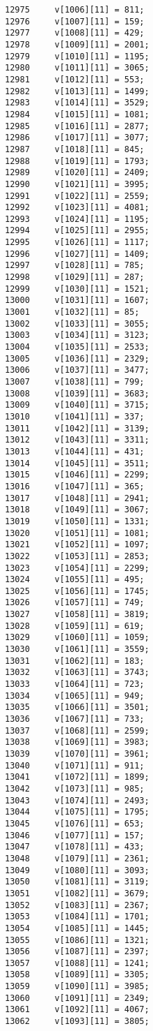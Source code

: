 \begin{Code}
\begin{verbatim}
12975     v[1006][11] = 811;
12976     v[1007][11] = 159;
12977     v[1008][11] = 429;
12978     v[1009][11] = 2001;
12979     v[1010][11] = 1195;
12980     v[1011][11] = 3065;
12981     v[1012][11] = 553;
12982     v[1013][11] = 1499;
12983     v[1014][11] = 3529;
12984     v[1015][11] = 1081;
12985     v[1016][11] = 2877;
12986     v[1017][11] = 3077;
12987     v[1018][11] = 845;
12988     v[1019][11] = 1793;
12989     v[1020][11] = 2409;
12990     v[1021][11] = 3995;
12991     v[1022][11] = 2559;
12992     v[1023][11] = 4081;
12993     v[1024][11] = 1195;
12994     v[1025][11] = 2955;
12995     v[1026][11] = 1117;
12996     v[1027][11] = 1409;
12997     v[1028][11] = 785;
12998     v[1029][11] = 287;
12999     v[1030][11] = 1521;
13000     v[1031][11] = 1607;
13001     v[1032][11] = 85;
13002     v[1033][11] = 3055;
13003     v[1034][11] = 3123;
13004     v[1035][11] = 2533;
13005     v[1036][11] = 2329;
13006     v[1037][11] = 3477;
13007     v[1038][11] = 799;
13008     v[1039][11] = 3683;
13009     v[1040][11] = 3715;
13010     v[1041][11] = 337;
13011     v[1042][11] = 3139;
13012     v[1043][11] = 3311;
13013     v[1044][11] = 431;
13014     v[1045][11] = 3511;
13015     v[1046][11] = 2299;
13016     v[1047][11] = 365;
13017     v[1048][11] = 2941;
13018     v[1049][11] = 3067;
13019     v[1050][11] = 1331;
13020     v[1051][11] = 1081;
13021     v[1052][11] = 1097;
13022     v[1053][11] = 2853;
13023     v[1054][11] = 2299;
13024     v[1055][11] = 495;
13025     v[1056][11] = 1745;
13026     v[1057][11] = 749;
13027     v[1058][11] = 3819;
13028     v[1059][11] = 619;
13029     v[1060][11] = 1059;
13030     v[1061][11] = 3559;
13031     v[1062][11] = 183;
13032     v[1063][11] = 3743;
13033     v[1064][11] = 723;
13034     v[1065][11] = 949;
13035     v[1066][11] = 3501;
13036     v[1067][11] = 733;
13037     v[1068][11] = 2599;
13038     v[1069][11] = 3983;
13039     v[1070][11] = 3961;
13040     v[1071][11] = 911;
13041     v[1072][11] = 1899;
13042     v[1073][11] = 985;
13043     v[1074][11] = 2493;
13044     v[1075][11] = 1795;
13045     v[1076][11] = 653;
13046     v[1077][11] = 157;
13047     v[1078][11] = 433;
13048     v[1079][11] = 2361;
13049     v[1080][11] = 3093;
13050     v[1081][11] = 3119;
13051     v[1082][11] = 3679;
13052     v[1083][11] = 2367;
13053     v[1084][11] = 1701;
13054     v[1085][11] = 1445;
13055     v[1086][11] = 1321;
13056     v[1087][11] = 2397;
13057     v[1088][11] = 1241;
13058     v[1089][11] = 3305;
13059     v[1090][11] = 3985;
13060     v[1091][11] = 2349;
13061     v[1092][11] = 4067;
13062     v[1093][11] = 3805;

\end{verbatim}
\end{Code}
